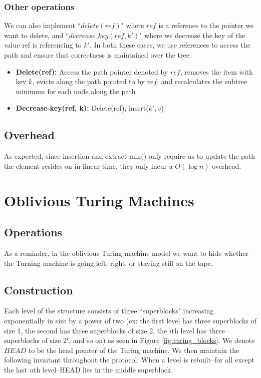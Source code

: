 \documentclass[11pt]{article}
\begin{document}
\subsubsection{Other operations}
We can also implement ``$delete(ref)$" where $ref$ is a reference to the pointer we want to delete, and ``$decrease\_key(ref, k')$" where we decrease the key of the value ref is referencing to $k'$. In both these cases, we use references to access the path and ensure that correctness is maintained over the tree.
\begin{itemize}
    \item \textbf{Delete(ref):} Access the path pointer denoted by $ref$, removes the item with key $k$, evicts along the path pointed to by $ref$, and recalculates the subtree minimum for each node along the path
    \item \textbf{Decrease-key(ref, k):} Delete(ref), insert($k', v$)
\end{itemize}

\subsection{Overhead}
As expected, since insertion and extract-min() only require us to update the path the element resides on in linear time, they only incur a $O(\log n)$ overhead.

\section{Oblivious Turing Machines}
\subsection{Operations}
As a reminder, in the oblivious Turing machine model we want to hide whether the Turning machine is going left, right, or staying still on the tape.

\subsection{Construction}
Each level of the structure consists of three ``superblocks" increasing exponentially in size by a power of two (ex: the first level has three superblocks of size 1, the second has three superblocks of size 2, the $i$th level has three superblocks of size $2^i$, and so on) as seen in Figure \ref{fig:turing_blocks}. We denote $HEAD$ to be the head pointer of the Turing machine. We then maintain the following invariant throughout the protocol: When a level is rebuilt--for all except the last $n$th level--HEAD lies in the middle superblock.
\end{document}
